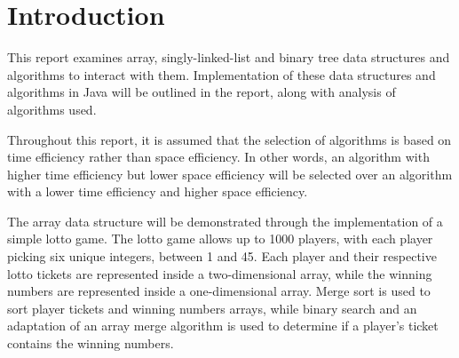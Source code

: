 \section{Introduction}

This report examines array, singly-linked-list and binary tree data structures and algorithms to interact with them. Implementation of these data structures and algorithms in Java will be outlined in the report, along with analysis of algorithms used. 

Throughout this report, it is assumed that the selection of algorithms is based on time efficiency rather than space efficiency. In other words, an algorithm with higher time efficiency but lower space efficiency will be selected over an algorithm with a lower time efficiency and higher space efficiency.

The array data structure will be demonstrated through the implementation of a simple lotto game. The lotto game allows up to 1000 players, with each player picking six unique integers, between 1 and 45. Each player and their respective lotto tickets are represented inside a two-dimensional array, while the winning numbers are represented inside a one-dimensional array. Merge sort is used to sort player tickets and winning numbers arrays, while binary search and an adaptation of an array merge algorithm is used to determine if a player's ticket contains the winning numbers. 